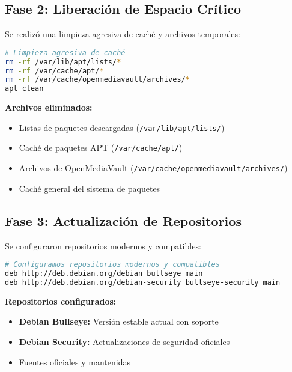\documentclass[12pt, a4paper]{article}
\begin{document}
\subsection{Fase 2: Liberación de Espacio Crítico}
\label{subsec:liberacion_espacio}

Se realizó una limpieza agresiva de caché y archivos temporales:

\begin{lstlisting}[language=bash, caption=Limpieza de espacio en disco]
# Limpieza agresiva de caché
rm -rf /var/lib/apt/lists/*
rm -rf /var/cache/apt/*
rm -rf /var/cache/openmediavault/archives/*
apt clean
\end{lstlisting}

\textbf{Archivos eliminados:}
\begin{itemize}
    \item Listas de paquetes descargadas (\texttt{/var/lib/apt/lists/})
    \item Caché de paquetes APT (\texttt{/var/cache/apt/})
    \item Archivos de OpenMediaVault (\texttt{/var/cache/openmediavault/archives/})
    \item Caché general del sistema de paquetes
\end{itemize}

\subsection{Fase 3: Actualización de Repositorios}
\label{subsec:actualizacion_repositorios}

Se configuraron repositorios modernos y compatibles:

\begin{lstlisting}[language=bash, caption=Configuración de nuevos repositorios]
# Configuramos repositorios modernos y compatibles
deb http://deb.debian.org/debian bullseye main
deb http://deb.debian.org/debian-security bullseye-security main
\end{lstlisting}

\textbf{Repositorios configurados:}
\begin{itemize}
    \item \textbf{Debian Bullseye:} Versión estable actual con soporte
    \item \textbf{Debian Security:} Actualizaciones de seguridad oficiales
    \item Fuentes oficiales y mantenidas
\end{itemize}
\end{document}

